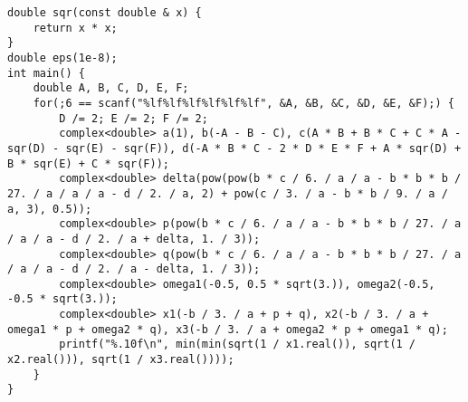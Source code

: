 \begin{lstlisting}
double sqr(const double & x) {
    return x * x;
}
double eps(1e-8);
int main() {
    double A, B, C, D, E, F;
    for(;6 == scanf("%lf%lf%lf%lf%lf%lf", &A, &B, &C, &D, &E, &F);) {
    	D /= 2; E /= 2; F /= 2;
        complex<double> a(1), b(-A - B - C), c(A * B + B * C + C * A - sqr(D) - sqr(E) - sqr(F)), d(-A * B * C - 2 * D * E * F + A * sqr(D) + B * sqr(E) + C * sqr(F));
        complex<double> delta(pow(pow(b * c / 6. / a / a - b * b * b / 27. / a / a / a - d / 2. / a, 2) + pow(c / 3. / a - b * b / 9. / a / a, 3), 0.5));
        complex<double> p(pow(b * c / 6. / a / a - b * b * b / 27. / a / a / a - d / 2. / a + delta, 1. / 3));
        complex<double> q(pow(b * c / 6. / a / a - b * b * b / 27. / a / a / a - d / 2. / a - delta, 1. / 3));
        complex<double> omega1(-0.5, 0.5 * sqrt(3.)), omega2(-0.5, -0.5 * sqrt(3.));
        complex<double> x1(-b / 3. / a + p + q), x2(-b / 3. / a + omega1 * p + omega2 * q), x3(-b / 3. / a + omega2 * p + omega1 * q);
        printf("%.10f\n", min(min(sqrt(1 / x1.real()), sqrt(1 / x2.real())), sqrt(1 / x3.real())));
    }
}
\end{lstlisting}
